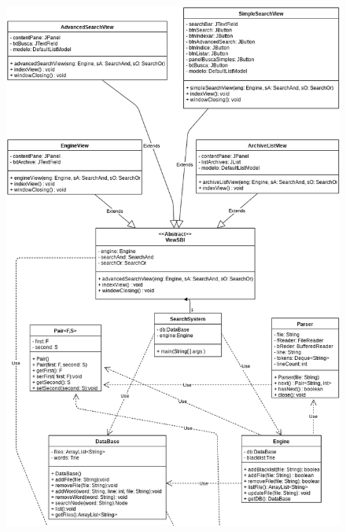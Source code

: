 \documentclass[12pt]{article}
\begin{document}
\begin{figure}[!htb]
\centering
\includegraphics[width=.96\textwidth]{img/sbi_project-part1.png}
\end{figure}
\end{document}
